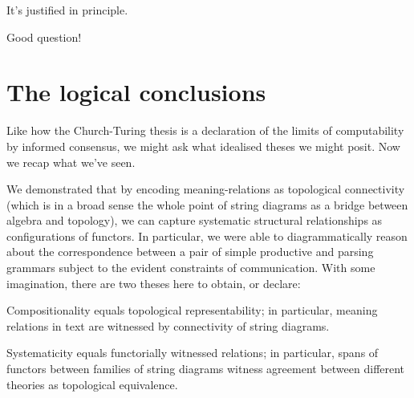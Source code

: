\clearpage

\clearpage
\newpage

 It's justified in principle.

 Good question!

\section{The logical conclusions}

Like how the Church-Turing thesis is a declaration of the limits of computability by informed consensus, we might ask what idealised theses we might posit. Now we recap what we've seen.

 We demonstrated that by encoding meaning-relations as topological connectivity (which is in a broad sense the whole point of string diagrams as a bridge between algebra and topology), we can capture systematic structural relationships as configurations of functors. In particular, we were able to diagrammatically reason about the correspondence between a pair of simple productive and parsing grammars subject to the evident constraints of communication. With some imagination, there are two theses here to obtain, or declare:

\begin{thesis}
Compositionality equals topological representability; in particular, meaning relations in text are witnessed by connectivity of string diagrams.
\end{thesis}

\begin{thesis}
Systematicity equals functorially witnessed relations; in particular, spans of functors between families of string diagrams witness agreement between different theories as topological equivalence.
\end{thesis}

